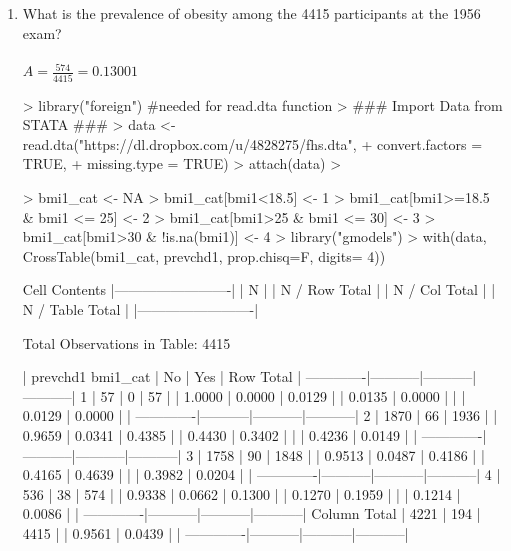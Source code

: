\documentclass{article}
\begin{document}
\begin{enumerate}
  \item What is the prevalence of obesity among the 4415 participants at the 1956 exam?\\\\
\(A = \frac{574}{4415}= 0.13001\)    
\begin{Schunk}
\begin{Sinput}
> library("foreign") #needed for read.dta function
> ### Import Data from STATA ###
> data <- read.dta("https://dl.dropbox.com/u/4828275/fhs.dta",
+                  convert.factors = TRUE,
+                  missing.type = TRUE)
> attach(data)
> 
\end{Sinput}
\end{Schunk}
\pagebreak
\begin{Schunk}
\begin{Sinput}
> bmi1_cat <- NA
> bmi1_cat[bmi1<18.5] <- 1
> bmi1_cat[bmi1>=18.5 & bmi1 <= 25] <- 2
> bmi1_cat[bmi1>25 & bmi1 <= 30] <- 3
> bmi1_cat[bmi1>30 & !is.na(bmi1)] <- 4
> library("gmodels")
> with(data, CrossTable(bmi1_cat, prevchd1, prop.chisq=F, digits= 4))
\end{Sinput}
\begin{Soutput}
   Cell Contents
|-------------------------|
|                       N |
|           N / Row Total |
|           N / Col Total |
|         N / Table Total |
|-------------------------|

 
Total Observations in Table:  4415 

 
             | prevchd1 
    bmi1_cat |        No |       Yes | Row Total | 
-------------|-----------|-----------|-----------|
           1 |        57 |         0 |        57 | 
             |    1.0000 |    0.0000 |    0.0129 | 
             |    0.0135 |    0.0000 |           | 
             |    0.0129 |    0.0000 |           | 
-------------|-----------|-----------|-----------|
           2 |      1870 |        66 |      1936 | 
             |    0.9659 |    0.0341 |    0.4385 | 
             |    0.4430 |    0.3402 |           | 
             |    0.4236 |    0.0149 |           | 
-------------|-----------|-----------|-----------|
           3 |      1758 |        90 |      1848 | 
             |    0.9513 |    0.0487 |    0.4186 | 
             |    0.4165 |    0.4639 |           | 
             |    0.3982 |    0.0204 |           | 
-------------|-----------|-----------|-----------|
           4 |       536 |        38 |       574 | 
             |    0.9338 |    0.0662 |    0.1300 | 
             |    0.1270 |    0.1959 |           | 
             |    0.1214 |    0.0086 |           | 
-------------|-----------|-----------|-----------|
Column Total |      4221 |       194 |      4415 | 
             |    0.9561 |    0.0439 |           | 
-------------|-----------|-----------|-----------|
\end{Soutput}
\end{Schunk}



\end{enumerate}
\end{document}
